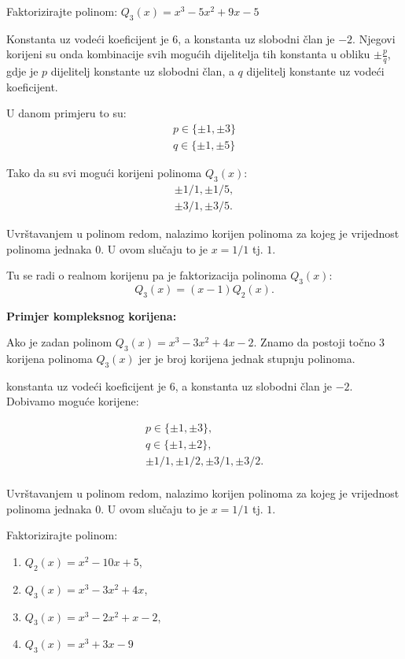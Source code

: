 \begin{example}
    Faktorizirajte polinom:
    $Q_3(x) = x^3-5x^2+9x-5$
\end{example}

Konstanta uz vodeći koeficijent je $6$, a konstanta uz slobodni član je $-2$.
Njegovi korijeni su onda kombinacije svih mogućih dijelitelja tih konstanta u
obliku $\pm\frac{p}{q}$, gdje je $p$ dijelitelj konstante uz slobodni član, a
$q$ dijelitelj konstante uz vodeći koeficijent.

U danom primjeru to su:
\begin{gather*}
p\in\{\pm1, \pm3\}\\
q\in\{\pm1, \pm5\}
\end{gather*}

Tako da su svi mogući korijeni polinoma $Q_3(x)$:
\begin{gather*}
\pm 1/1, \pm 1/5,\\
\pm 3/1, \pm 3/5.
\end{gather*}

Uvrštavanjem u polinom redom, nalazimo korijen polinoma za kojeg je vrijednost
polinoma jednaka $0$. U ovom slučaju to je $x=1/1$ tj. $1$.

Tu se radi o realnom korijenu pa je faktorizacija polinoma $Q_3(x)$:
$$
Q_3(x) = (x-1)Q_2(x).
$$

\textbf{Primjer kompleksnog korijena:}

Ako je zadan polinom $Q_3(x) = x^3-3x^2+4x-2$. Znamo da postoji točno $3$
korijena polinoma $Q_3(x)$ jer je broj korijena jednak stupnju polinoma.


konstanta uz vodeći koeficijent je 6,
a konstanta uz slobodni član je $-2$. Dobivamo moguće korijene:

\begin{gather*}
p\in\{\pm1, \pm3\},\\
q\in\{\pm1, \pm2\},\\
\pm 1/1, \pm 1/2, \pm 3/1, \pm 3/2.\\
\end{gather*}

Uvrštavanjem u polinom redom, nalazimo korijen polinoma za kojeg je vrijednost
polinoma jednaka $0$. U ovom slučaju to je $x=1/1$ tj. $1$.


\begin{example}
    Faktorizirajte polinom:
    \begin{enumerate}
        \item $Q_2(x) = x^2-10x+5$,
        \item $Q_3(x) = x^3-3x^2+4x$,
        \item $Q_3(x) = x^3-2x^2+x-2$,
        \item $Q_3(x) = x^3+3x-9$
    \end{enumerate}
\end{example}

